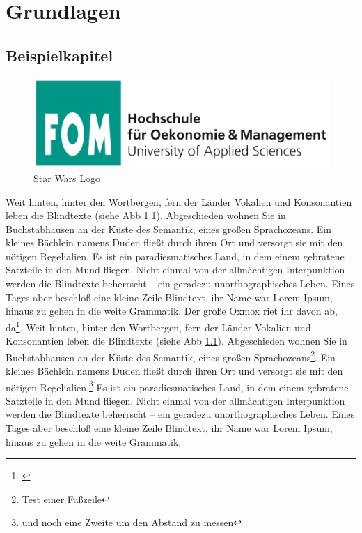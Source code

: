 \chapter{Grundlagen}
\label{sec:grundlagen}


\section{Beispielkapitel}
\label{sec:beispiel}
\begin{figure}[htb]
  \centering  
  \includegraphics[scale=0.2]{img/fomlogo.png}
  \caption{Star Wars Logo}
  \label{fig:starwars}
\end{figure}
Weit hinten, hinter den Wortbergen, fern der Länder Vokalien und Konsonantien leben die Blindtexte (siehe Abb \ref{fig:starwars}). Abgeschieden wohnen Sie in Buchstabhausen an der Küste des Semantik, eines großen Sprachozeans. Ein kleines Bächlein namens Duden fließt durch ihren Ort und versorgt sie mit den nötigen Regelialien. Es ist ein paradiesmatisches Land, in dem einem gebratene Satzteile in den Mund fliegen. Nicht einmal von der allmächtigen Interpunktion werden die Blindtexte beherrscht – ein geradezu unorthographisches Leben. Eines Tages aber beschloß eine kleine Zeile Blindtext, ihr Name war Lorem Ipsum, hinaus zu gehen in die weite Grammatik. Der große Oxmox riet ihr davon ab, da\footnote{\cite[vgl.][S.60]{Khan2016}}.
Weit hinten, hinter den Wortbergen, fern der Länder Vokalien und Konsonantien leben die Blindtexte (siehe Abb \ref{fig:starwars}). Abgeschieden wohnen Sie in Buchstabhausen an der Küste des Semantik, eines großen Sprachozeans\footnote{Test einer Fußzeile}. Ein kleines Bächlein namens Duden fließt durch ihren Ort und versorgt sie mit den nötigen Regelialien.\footnote{und noch eine Zweite um den Abstand zu messen} Es ist ein paradiesmatisches Land, in dem einem gebratene Satzteile in den Mund fliegen. Nicht einmal von der allmächtigen Interpunktion werden die Blindtexte beherrscht – ein geradezu unorthographisches Leben. Eines Tages aber beschloß eine kleine Zeile Blindtext, ihr Name war Lorem Ipsum, hinaus zu gehen in die weite Grammatik.

